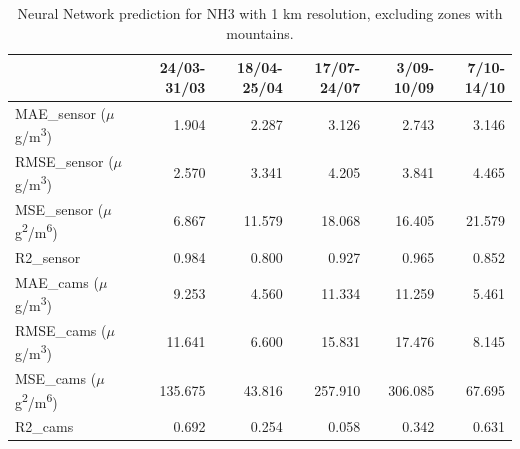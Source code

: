 \begin{table}[H]
\begin{tabular}{lrrrrr}
\toprule
 &  24/03-31/03 &  18/04-25/04 &  17/07-24/07 &  3/09-10/09 &  7/10-14/10 \\
\midrule
 MAE\_sensor ($\mu$g/m\textsuperscript{3})&        1.904 &        2.287 &        3.126 &       2.743 &       3.146 \\
RMSE\_sensor ($\mu$g/m\textsuperscript{3})&        2.570 &        3.341 &        4.205 &       3.841 &       4.465 \\
 MSE\_sensor ($\mu$g\textsuperscript{2}/m\textsuperscript{6})&        6.867 &       11.579 &       18.068 &      16.405 &      21.579 \\
  R2\_sensor &        0.984 &        0.800 &        0.927 &       0.965 &       0.852 \\
   MAE\_cams ($\mu$g/m\textsuperscript{3})&        9.253 &        4.560 &       11.334 &      11.259 &       5.461 \\
  RMSE\_cams ($\mu$g/m\textsuperscript{3})&       11.641 &        6.600 &       15.831 &      17.476 &       8.145 \\
   MSE\_cams ($\mu$g\textsuperscript{2}/m\textsuperscript{6})&      135.675 &       43.816 &      257.910 &     306.085 &      67.695 \\
    R2\_cams &        0.692 &        0.254 &        0.058 &       0.342 &       0.631 \\
\bottomrule
\end{tabular}
\caption{Neural Network prediction for NH3 with 1 km resolution, excluding zones with mountains.}
\end{table}










